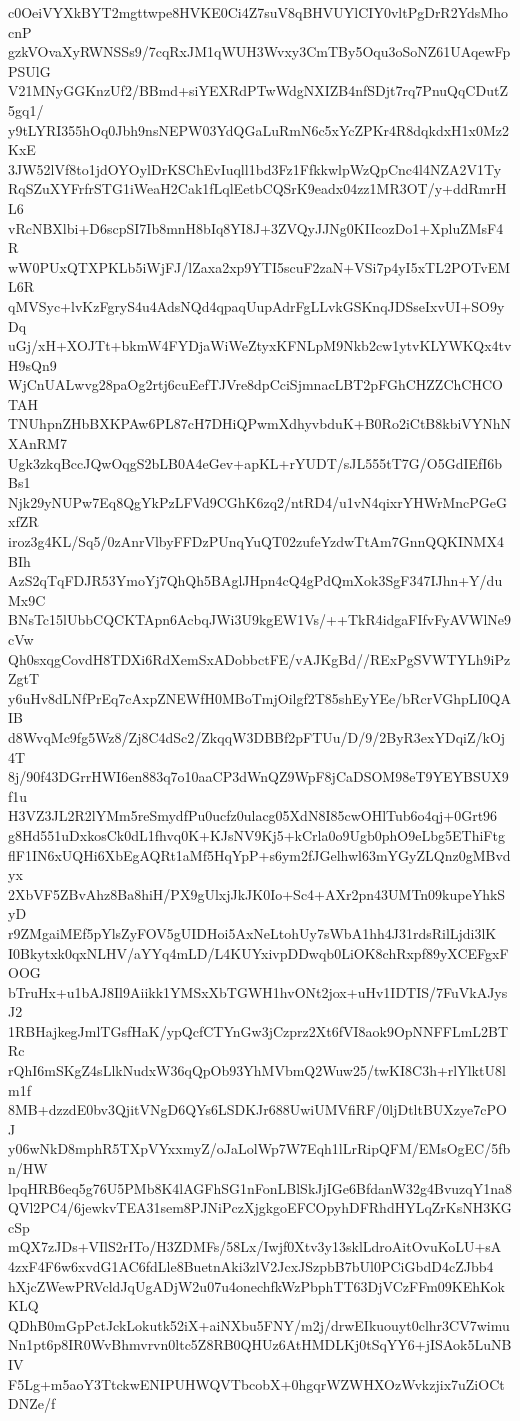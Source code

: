 c0OeiVYXkBYT2mgttwpe8HVKE0Ci4Z7suV8qBHVUYlCIY0vltPgDrR2YdsMhocnP
gzkVOvaXyRWNSSs9/7cqRxJM1qWUH3Wvxy3CmTBy5Oqu3oSoNZ61UAqewFpPSUlG
V21MNyGGKnzUf2/BBmd+siYEXRdPTwWdgNXIZB4nfSDjt7rq7PnuQqCDutZ5gq1/
y9tLYRI355hOq0Jbh9nsNEPW03YdQGaLuRmN6c5xYcZPKr4R8dqkdxH1x0Mz2KxE
3JW52lVf8to1jdOYOylDrKSChEvIuqll1bd3Fz1FfkkwlpWzQpCnc4l4NZA2V1Ty
RqSZuXYFrfrSTG1iWeaH2Cak1fLqlEetbCQSrK9eadx04zz1MR3OT/y+ddRmrHL6
vRcNBXlbi+D6scpSI7Ib8mnH8bIq8YI8J+3ZVQyJJNg0KIIcozDo1+XpluZMsF4R
wW0PUxQTXPKLb5iWjFJ/lZaxa2xp9YTI5scuF2zaN+VSi7p4yI5xTL2POTvEML6R
qMVSyc+lvKzFgryS4u4AdsNQd4qpaqUupAdrFgLLvkGSKnqJDSseIxvUI+SO9yDq
uGj/xH+XOJTt+bkmW4FYDjaWiWeZtyxKFNLpM9Nkb2cw1ytvKLYWKQx4tvH9sQn9
WjCnUALwvg28paOg2rtj6cuEefTJVre8dpCciSjmnacLBT2pFGhCHZZChCHCOTAH
TNUhpnZHbBXKPAw6PL87cH7DHiQPwmXdhyvbduK+B0Ro2iCtB8kbiVYNhNXAnRM7
Ugk3zkqBccJQwOqgS2bLB0A4eGev+apKL+rYUDT/sJL555tT7G/O5GdIEfI6bBs1
Njk29yNUPw7Eq8QgYkPzLFVd9CGhK6zq2/ntRD4/u1vN4qixrYHWrMncPGeGxfZR
iroz3g4KL/Sq5/0zAnrVlbyFFDzPUnqYuQT02zufeYzdwTtAm7GnnQQKINMX4BIh
AzS2qTqFDJR53YmoYj7QhQh5BAglJHpn4cQ4gPdQmXok3SgF347IJhn+Y/duMx9C
BNsTc15lUbbCQCKTApn6AcbqJWi3U9kgEW1Vs/++TkR4idgaFIfvFyAVWlNe9cVw
Qh0sxqgCovdH8TDXi6RdXemSxADobbctFE/vAJKgBd//RExPgSVWTYLh9iPzZgtT
y6uHv8dLNfPrEq7cAxpZNEWfH0MBoTmjOilgf2T85shEyYEe/bRcrVGhpLI0QAIB
d8WvqMc9fg5Wz8/Zj8C4dSc2/ZkqqW3DBBf2pFTUu/D/9/2ByR3exYDqiZ/kOj4T
8j/90f43DGrrHWI6en883q7o10aaCP3dWnQZ9WpF8jCaDSOM98eT9YEYBSUX9f1u
H3VZ3JL2R2lYMm5reSmydfPu0ucfz0ulacg05XdN8I85cwOHlTub6o4qj+0Grt96
g8Hd551uDxkosCk0dL1fhvq0K+KJsNV9Kj5+kCrla0o9Ugb0phO9eLbg5EThiFtg
flF1IN6xUQHi6XbEgAQRt1aMf5HqYpP+s6ym2fJGelhwl63mYGyZLQnz0gMBvdyx
2XbVF5ZBvAhz8Ba8hiH/PX9gUlxjJkJK0Io+Sc4+AXr2pn43UMTn09kupeYhkSyD
r9ZMgaiMEf5pYlsZyFOV5gUIDHoi5AxNeLtohUy7sWbA1hh4J31rdsRilLjdi3lK
I0Bkytxk0qxNLHV/aYYq4mLD/L4KUYxivpDDwqb0LiOK8chRxpf89yXCEFgxFOOG
bTruHx+u1bAJ8Il9Aiikk1YMSxXbTGWH1hvONt2jox+uHv1IDTIS/7FuVkAJysJ2
1RBHajkegJmlTGsfHaK/ypQcfCTYnGw3jCzprz2Xt6fVI8aok9OpNNFFLmL2BTRc
rQhI6mSKgZ4sLlkNudxW36qQpOb93YhMVbmQ2Wuw25/twKI8C3h+rlYlktU8lm1f
8MB+dzzdE0bv3QjitVNgD6QYs6LSDKJr688UwiUMVfiRF/0ljDtltBUXzye7cPOJ
y06wNkD8mphR5TXpVYxxmyZ/oJaLolWp7W7Eqh1lLrRipQFM/EMsOgEC/5fbn/HW
lpqHRB6eq5g76U5PMb8K4lAGFhSG1nFonLBlSkJjIGe6BfdanW32g4BvuzqY1na8
QVl2PC4/6jewkvTEA31sem8PJNiPczXjgkgoEFCOpyhDFRhdHYLqZrKsNH3KGcSp
mQX7zJDs+VIlS2rITo/H3ZDMFs/58Lx/Iwjf0Xtv3y13sklLdroAitOvuKoLU+sA
4zxF4F6w6xvdG1AC6fdLle8BuetnAki3zlV2JcxJSzpbB7bUl0PCiGbdD4cZJbb4
hXjcZWewPRVcldJqUgADjW2u07u4onechfkWzPbphTT63DjVCzFFm09KEhKokKLQ
QDhB0mGpPctJckLokutk52iX+aiNXbu5FNY/m2j/drwEIkuouyt0clhr3CV7wimu
Nn1pt6p8IR0WvBhmvrvn0ltc5Z8RB0QHUz6AtHMDLKj0tSqYY6+jISAok5LuNBIV
F5Lg+m5aoY3TtckwENIPUHWQVTbcobX+0hgqrWZWHXOzWvkzjix7uZiOCtDNZe/f
